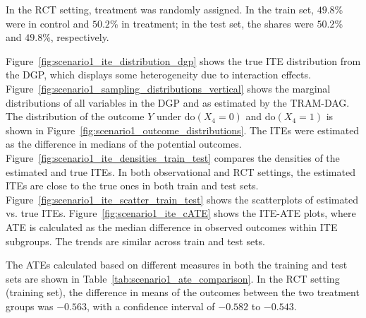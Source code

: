 In the RCT setting, treatment was randomly assigned. In the train set, $49.8$\% were in control and $50.2$\% in treatment; in the test set, the shares were $50.2$\% and $49.8$\%, respectively.

Figure~\ref{fig:scenario1_ite_distribution_dgp} shows the true ITE distribution from the DGP, which displays some heterogeneity due to interaction effects. Figure~\ref{fig:scenario1_sampling_distributions_vertical} shows the marginal distributions of all variables in the DGP and as estimated by the TRAM-DAG. The distribution of the outcome $Y$ under $\text{do}(X_4 = 0)$ and $\text{do}(X_4 = 1)$ is shown in Figure~\ref{fig:scenario1_outcome_distributions}. The ITEs were estimated as the difference in medians of the potential outcomes. Figure~\ref{fig:scenario1_ite_densities_train_test} compares the densities of the estimated and true ITEs. In both observational and RCT settings, the estimated ITEs are close to the true ones in both train and test sets. Figure~\ref{fig:scenario1_ite_scatter_train_test} shows the scatterplots of estimated vs. true ITEs. Figure~\ref{fig:scenario1_ite_cATE} shows the ITE-ATE plots, where ATE is calculated as the median difference in observed outcomes within ITE subgroups. The trends are similar across train and test sets.



The ATEs calculated based on different measures in both the training and test sets are shown in Table~\ref{tab:scenario1_ate_comparison}. In the RCT setting (training set), the difference in means of the outcomes between the two treatment groups was 
$-0.563$, with a confidence interval of 
$-0.582$ to 
$-0.543$. 



